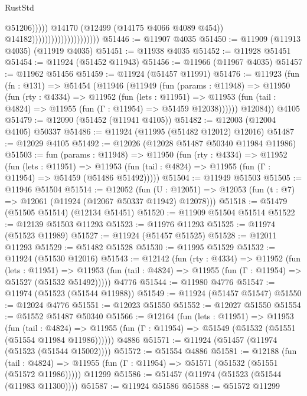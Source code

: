 \begin{lexlean}{RustStd}
\begin{coremodule}
                                                        @51206)))))
                                              @14170
                                              (@12499 (@14175 @4066 @4089 @454))
                                              @14182)))))))))))))))))))))
@51446 := @11907 @4035
@51450 := @11909 (@11913 @4035) (@11919 @4035)
@51451 := @11938 @4035
@51452 := @11928 @51451
@51454 := @11924 (@51452 @11943)
@51456 := @11966 (@11967 @4035)
@51457 := @11962 @51456
@51459 := @11924 (@51457 @11991)
@51476 := @11923
    (fun (fn : @131) =>
    @51454
      (@11946
        (@11949
          (fun (params : @11948) =>
          @11950
            (fun (rty : @4334) =>
            @11952
              (fun (lets : @11951) =>
              @11953 (fun (tail : @4824) => @11955 (fun (Γ : @11954) => @51459 @12038))))))
        @12084))
    @4105
@51479 := @12090 (@51452 (@11941 @4105))
@51482 := @12003 (@12004 @4105) @50337
@51486 := @11924 (@11995 (@51482 @12012) @12016)
@51487 := @12029 @4105
@51492 := @12026 (@12028 @51487 @50340 @11984 @11986)
@51503 := fun (params : @11948) =>
  @11950
    (fun (rty : @4334) =>
    @11952
      (fun (lets : @11951) =>
      @11953 (fun (tail : @4824) => @11955 (fun (Γ : @11954) => @51459 (@51486 @51492)))))
@51504 := @11949 @51503
@51505 := @11946 @51504
@51514 := @12052
    (fun (U : @12051) => @12053 (fun (t : @7) => @12061 (@11924 (@12067 @50337 @11942) @12078)))
@51518 := @51479 (@51505 @51514) (@12134 @51451)
@51520 := @11909 @51504 @51514
@51522 := @12139 @51503 @11293
@51523 := @11976 @11293
@51525 := @11974 (@51523 @11989)
@51527 := @11924 (@51457 @51525)
@51528 := @12011 @11293
@51529 := @51482 @51528
@51530 := @11995 @51529
@51532 := @11924 (@51530 @12016)
@51543 := @12142
    (fun (rty : @4334) =>
    @11952
      (fun (lets : @11951) =>
      @11953 (fun (tail : @4824) => @11955 (fun (Γ : @11954) => @51527 (@51532 @51492)))))
    @4776
@51544 := @11980 @4776
@51547 := @11974 (@51523 (@51544 @11988))
@51549 := @11924 (@51457 @51547)
@51550 := @12024 @4776
@51551 := @12023 @51550
@51552 := @12027 @51550
@51554 := @51552 @51487 @50340
@51566 := @12164
    (fun (lets : @11951) =>
    @11953
      (fun (tail : @4824) =>
      @11955 (fun (Γ : @11954) => @51549 (@51532 (@51551 (@51554 @11984 @11986))))))
    @4886
@51571 := @11924 (@51457 (@11974 (@51523 (@51544 @15002))))
@51572 := @51554 @4886
@51581 := @12188
    (fun (tail : @4824) => @11955 (fun (Γ : @11954) => @51571 (@51532 (@51551 (@51572 @11986)))))
    @11299
@51586 := @51457 (@11974 (@51523 (@51544 (@11983 @11300))))
@51587 := @11924 @51586
@51588 := @51572 @11299

\end{coremodule}
\end{lexlean}
